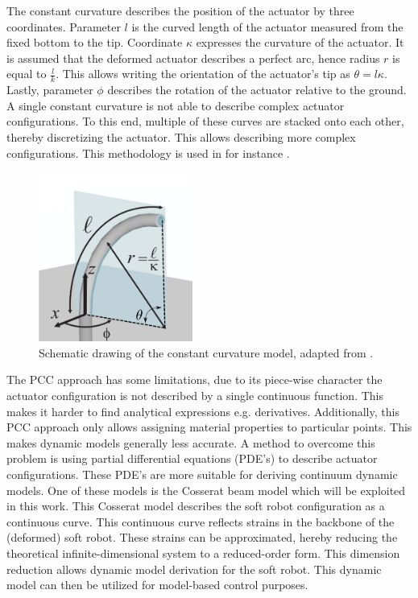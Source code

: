 The constant curvature describes the position of the actuator by three coordinates. Parameter $l$ is the curved length of the actuator measured from the fixed bottom to the tip. Coordinate $\kappa$ expresses the curvature of the actuator. It is assumed that the deformed actuator describes a perfect arc, hence radius $r$ is equal to $\frac{l}{k}$. This allows writing the orientation of the actuator's tip as $\theta = l\kappa$. Lastly, parameter $\phi$ describes the rotation of the actuator relative to the ground. A single constant curvature is not able to describe complex actuator configurations. To this end, multiple of these curves are stacked onto each other, thereby discretizing the actuator. This allows describing more complex configurations. This methodology is used in for instance \cite{Falkenhahn2015}.



\begin{figure}[H]
    \centering
    \includegraphics[width = 0.45\textwidth]{Figures/Chapter1/ccapproach2.png}
    \caption{Schematic drawing of the constant curvature model, adapted from \cite{ccapproach}.}
    \label{fig2:ccapproach}
\end{figure}

The PCC approach has some limitations, due to its piece-wise character the actuator configuration is not described by a single continuous function. This makes it harder to find analytical expressions e.g. derivatives. Additionally, this PCC approach only allows assigning material properties to particular points. This makes dynamic models generally less accurate. A method to overcome this problem is using partial differential equations (PDE's) to describe actuator configurations. These PDE's are more suitable for deriving continuum dynamic models. One of these models is the Cosserat beam model which will be exploited in this work. This Cosserat model describes the soft robot configuration as a continuous curve. This continuous curve reflects strains in the backbone of the (deformed) soft robot. These strains can be approximated, hereby reducing the theoretical infinite-dimensional system to a reduced-order form. This dimension reduction allows dynamic model derivation for the soft robot. This dynamic model can then be utilized for model-based control purposes.



